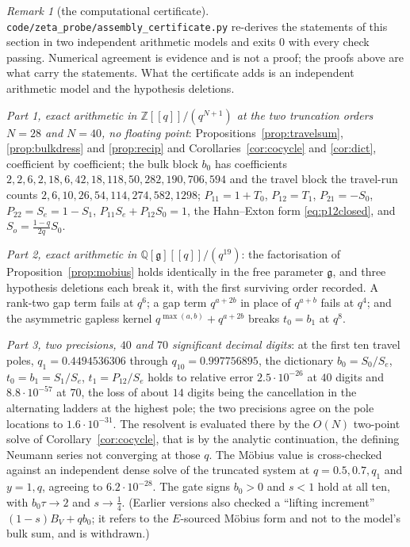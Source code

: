 \documentclass[11pt]{article}
\theoremstyle{plain}
\theoremstyle{definition}
\theoremstyle{remark}
\newtheorem{remark}[theorem]{Remark}
\newcommand{\Z}{\mathbb{Z}}
\newcommand{\Q}{\mathbb{Q}}
\begin{document}
\begin{remark}[the computational certificate]\label{rem:assemblycert}
\texttt{code/zeta\_probe/assembly\_certificate.py} re-derives the statements of this section in
two independent arithmetic models and exits $0$ with every check passing. Numerical agreement is
evidence and is not a proof; the proofs above are what carry the statements. What the certificate
adds is an independent arithmetic model and the hypothesis deletions.

\emph{Part 1, exact arithmetic in $\Z[[q]]/(q^{N+1})$ at the two truncation orders $N=28$ and
$N=40$, no floating point}: Propositions~\ref{prop:travelsum}, \ref{prop:bulkdress} and
\ref{prop:recip} and Corollaries~\ref{cor:cocycle} and \ref{cor:dict}, coefficient by
coefficient; the bulk block $b_0$ has coefficients
$2,2,6,2,18,6,42,18,118,50,282,190,706,594$ and the travel block the travel-run counts
$2,6,10,26,54,114,274,582,1298$; $P_{11}=1+T_0$, $P_{12}=T_1$, $P_{21}=-S_0$, $P_{22}=S_e=1-S_1$,
$P_{11}S_e+P_{12}S_0=1$, the Hahn--Exton form \eqref{eq:p12closed}, and $S_o=\frac{1-q}{2q}S_0$.

\emph{Part 2, exact arithmetic in $\Q[\mathfrak g][[q]]/(q^{19})$}: the factorisation of
Proposition~\ref{prop:mobius} holds identically in the free parameter $\mathfrak g$, and three
hypothesis deletions each break it, with the first surviving order recorded. A rank-two gap term
fails at $q^{6}$; a gap term $q^{a+2b}$ in place of $q^{a+b}$ fails at $q^{4}$; and the asymmetric
gapless kernel $q^{\max(a,b)}+q^{a+2b}$ breaks $t_0=b_1$ at $q^{8}$.

\emph{Part 3, two precisions, $40$ and $70$ significant decimal digits}: at the first ten travel
poles, $q_1=0.4494536306$ through $q_{10}=0.997756895$, the dictionary $b_0=S_0/S_e$,
$t_0=b_1=S_1/S_e$, $t_1=P_{12}/S_e$ holds to relative error $2.5\cdot10^{-26}$ at $40$ digits and
$8.8\cdot10^{-57}$ at $70$, the loss of about $14$ digits being the cancellation in the
alternating ladders at the highest pole; the two precisions agree on the pole locations to
$1.6\cdot10^{-31}$. The resolvent is evaluated there by the $O(N)$ two-point solve of
Corollary~\ref{cor:cocycle}, that is by the analytic continuation, the defining Neumann series not
converging at those $q$. The M\"obius value is cross-checked against an independent dense solve of
the truncated system at $q=0.5,0.7,q_1$ and $y=1,q$, agreeing to $6.2\cdot10^{-28}$. The gate
signs $b_0>0$ and $s<1$ hold at all ten, with $b_0\tau\to2$ and $s\to\tfrac14$. (Earlier versions
also checked a ``lifting increment'' $(1-s)B_V+qb_0$; it refers to the $E$-sourced M\"obius form and
not to the model's bulk sum, and is withdrawn.)


\end{remark}
\end{document}
